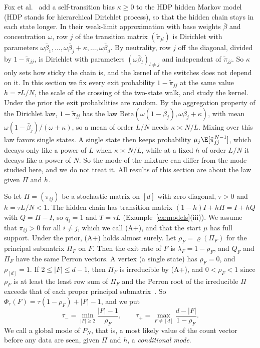 Fox et al.~\cite{fox2011} add a self-transition bias $\kappa\ge0$ to the HDP
hidden Markov model (HDP stands for hierarchical Dirichlet process), so that
the hidden chain stays in each state longer. In their weak-limit approximation
with base weights $\bar\beta$ and concentration $\omega$, row $j$ of the
transition matrix $(\tilde\pi_{jl})$ is Dirichlet with parameters
$\omega\bar\beta_1,\dots,\omega\bar\beta_j+\kappa,\dots,\omega\bar\beta_d$. By
neutrality, row $j$ off the diagonal, divided by $1-\tilde\pi_{jj}$, is Dirichlet
with parameters $(\omega\bar\beta_l)_{l\ne j}$ and independent of $\tilde\pi_{jj}$. So
$\kappa$ only sets how sticky the chain is, and the kernel of the switches does
not depend on it. In this section we fix every exit probability $1-\tilde\pi_{jj}$ at
the same value $h=\tau L/N$, the scale of the crossing of the two-state walk, and study the
kernel. Under the prior the exit probabilities are random. By the aggregation
property of the Dirichlet law, $1-\tilde\pi_{jj}$ has the law
$\mathrm{Beta}(\omega(1-\bar\beta_j),\omega\bar\beta_j+\kappa)$, with mean
$\omega(1-\bar\beta_j)/(\omega+\kappa)$, so a mean of order $L/N$ needs
$\kappa\asymp N/L$. Mixing over this law favors single states. A single state then
keeps probability $\mu_j\E[\tilde\pi_{jj}^{N-1}]$, which decays only like a power of
$L$ when $\kappa\asymp N/L$, while at a fixed $h$ of order $L/N$ it decays like a power
of $N$. So the mode of the mixture can differ from the mode studied here, and we do not
treat it. All results of this section are about the law given $\Pi$ and $h$.

So let $\Pi=(\pi_{ij})$ be a stochastic matrix on $[d]$ with zero diagonal,
$\tau>0$ and $h=\tau L/N<1$. The hidden chain has transition matrix
$(1-h)I+h\Pi=I+hQ$ with $Q=\Pi-I$, so
$q_i=1$ and $T=\tau L$ (Example~\ref{ex:models}(iii)). We assume that
$\pi_{ij}>0$ for all $i\ne j$, which we call (A+), and that the start $\mu$ has
full support. Under the prior, \textup{(A+)} holds almost surely. Let
$\rho_F=\varrho(\Pi_F)$ for the principal submatrix $\Pi_F$ on $F$. Then the
exit rate of $F$ is $\lambda_F=1-\rho_F$, and
$Q_F$ and $\Pi_F$ have the same Perron vectors. A vertex (a single state) has
$\rho_F=0$, and
$\rho_{[d]}=1$. If $2\le|F|\le d-1$, then $\Pi_F$ is irreducible by (A+), and
$0<\rho_F<1$ since $\rho_F$ is at least the least row sum of $\Pi_F$ and the
Perron root of the irreducible $\Pi$ exceeds that of each proper principal
submatrix~\cite{bermanplemmons1994}. So
$\Phi_\tau(F)=\tau(1-\rho_F)+|F|-1$, and we put
\[
 \tau_-=\min_{|F|\ge2}\frac{|F|-1}{\rho_F},\qquad
 \tau_+=\max_{F\ne[d]}\frac{d-|F|}{1-\rho_F}.
\]
We call a global mode of $P_N$, that is, a most likely value of the count
vector before any data are seen, given $\Pi$ and $h$, a \emph{conditional mode}.

